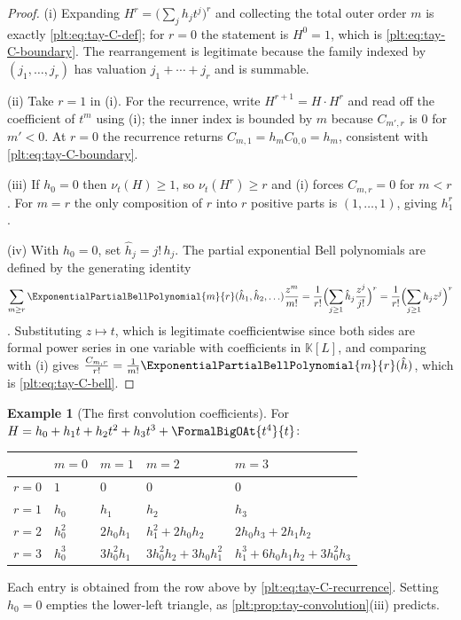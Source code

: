 \documentclass[11pt,oneside]{article}
\theoremstyle{plain}
\theoremstyle{definition}
\newtheorem{example}[theorem]{Example}
\theoremstyle{remark}
\newcommand{\K}{\mathbb{K}}
\newcommand{\ordt}{\nu_{t}}                              %
\begin{document}
\begin{proof}
(i) Expanding \(H^{r}=\bigl(\sum_{j}h_jt^{j}\bigr)^{r}\) and collecting the
total outer order \(m\) is exactly \eqref{plt:eq:tay-C-def}; for \(r=0\) the
statement is \(H^{0}=1\), which is
\eqref{plt:eq:tay-C-boundary}.  The rearrangement is legitimate because the
family indexed by \((j_{1},\ldots,j_{r})\) has valuation
\(j_{1}+\cdots+j_{r}\) and is summable.

(ii) Take \(r=1\) in (i).  For the recurrence, write
\(H^{r+1}=H\cdot H^{r}\) and read off the coefficient of \(t^{m}\) using (i);
the inner index is bounded by \(m\) because \(C_{m',r}\) is \(0\) for
\(m'<0\).  At \(r=0\) the recurrence returns
\(C_{m,1}=h_{m}C_{0,0}=h_{m}\), consistent with
\eqref{plt:eq:tay-C-boundary}.

(iii) If \(h_{0}=0\) then \(\ordt(H)\ge1\), so \(\ordt(H^{r})\ge r\) and (i)
forces \(C_{m,r}=0\) for \(m<r\).  For \(m=r\) the only composition of \(r\)
into \(r\) positive parts is \((1,\ldots,1)\), giving \(h_{1}^{r}\).

(iv) With \(h_{0}=0\), set \(\hat h_{j}=j!\,h_{j}\).  The partial exponential
Bell polynomials are defined by the generating identity
\[
 \sum_{m\ge r}\ExponentialPartialBellPolynomial{m}{r}
   (\hat h_{1},\hat h_{2},\ldots)\frac{z^{m}}{m!}
 =\frac{1}{r!}\Bigl(\sum_{j\ge1}\hat h_{j}\frac{z^{j}}{j!}\Bigr)^{r}
 =\frac{1}{r!}\Bigl(\sum_{j\ge1}h_{j}z^{j}\Bigr)^{r}
\]
\cite{comtet-book}.  Substituting \(z\mapsto t\), which is legitimate
coefficientwise since both sides are formal power series in one variable with
coefficients in \(\K[L]\), and comparing with (i) gives
\(\frac{C_{m,r}}{r!}=\frac{1}{m!}\ExponentialPartialBellPolynomial{m}{r}(\hat h)\),
which is \eqref{plt:eq:tay-C-bell}.
\end{proof}

\begin{example}[The first convolution coefficients]\label{plt:ex:tay-C-table}
For \(H=h_{0}+h_{1}t+h_{2}t^{2}+h_{3}t^{3}+\FormalBigOAt{t^{4}}{t}\):
\begin{center}
\begin{tabular}{@{}lllll@{}}
\hline
 & \(m=0\) & \(m=1\) & \(m=2\) & \(m=3\)\\
\hline
\(r=0\) & \(1\) & \(0\) & \(0\) & \(0\)\\
\(r=1\) & \(h_{0}\) & \(h_{1}\) & \(h_{2}\) & \(h_{3}\)\\
\(r=2\) & \(h_{0}^{2}\) & \(2h_{0}h_{1}\)
        & \(h_{1}^{2}+2h_{0}h_{2}\)
        & \(2h_{0}h_{3}+2h_{1}h_{2}\)\\
\(r=3\) & \(h_{0}^{3}\) & \(3h_{0}^{2}h_{1}\)
        & \(3h_{0}^{2}h_{2}+3h_{0}h_{1}^{2}\)
        & \(h_{1}^{3}+6h_{0}h_{1}h_{2}+3h_{0}^{2}h_{3}\)\\
\hline
\end{tabular}
\end{center}
Each entry is obtained from the row above by
\eqref{plt:eq:tay-C-recurrence}.  Setting \(h_{0}=0\) empties the lower-left
triangle, as \cref{plt:prop:tay-convolution}(iii) predicts.
\end{example}
\end{document}

